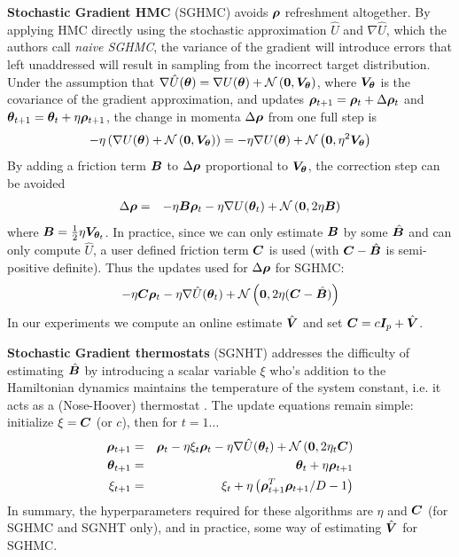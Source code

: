 \documentclass[]{article}
\begin{document}
{\bf Stochastic Gradient HMC} (SGHMC) \cite{chen2014stochastic} avoids ${\bm \rho}$ refreshment altogether.  By applying HMC directly using the stochastic approximation $\hat{U}$ and $\nabla \hat{U}$, which the authors call {\em naive SGHMC}, the variance of the gradient will introduce errors that left unaddressed will result in sampling from the incorrect target distribution.  Under the assumption that $\nabla \hat{U}({\bm \theta}) = \nabla U({\bm \theta}) + \mathcal{N}\left( {\bm 0}, {\bm V}_{{\bm \theta}}\right)$, where ${\bm V}_{{\bm \theta}}$ is the covariance of the gradient approximation, and  updates ${\bm \rho}_{t+1} = {\bm \rho}_{t} + \Delta {\bm \rho}_{t}$ and ${\bm \theta}_{t+1} = {\bm \theta}_t + \eta {\bm \rho}_{t+1}$, the change in momenta $\Delta {\bm \rho}$ from one full step is
 \begin{equation}
   - \eta \left( \nabla U({\bm \theta}) + \mathcal{N}\left( {\bm 0}, {\bm V}_{{\bm \theta}}\right)\right)  =  - \eta \nabla U({\bm \theta}) + \mathcal{N}\left( {\bm 0}, \eta^2 {\bm V}_{{\bm \theta}}\right)  
 \end{equation}
By adding a friction term ${\bm B}$ to $\Delta {\bm \rho}$ proportional to ${\bm V}_{{\bm \theta}}$, the correction step can be avoided
 \begin{eqnarray}
   \Delta {\bm \rho} & = & - \eta {\bm B} {\bm \rho}_t - \eta \nabla U({\bm \theta}_t) + \mathcal{N}\left( {\bm 0}, 2 \eta {\bm B}\right) 
 \end{eqnarray}
 where  ${\bm B}=\frac{1}{2}\eta {\bm V}_{{\bm \theta}_t}$.   In practice, since we can only estimate ${\bm B}$ by some $\hat{{\bm B}}$ and can only compute $\hat{U}$, a user defined friction term ${\bm C}$ is used (with ${\bm C} - \hat{{\bm B}}$ is semi-positive definite).  Thus the updates used for $\Delta {\bm \rho}$ for SGHMC:
 \begin{equation}
   - \eta {\bm C} {\bm \rho}_t - \eta \nabla \hat{U}({\bm \theta}_t) + \mathcal{N}\left( {\bm 0}, 2 \eta ({\bm C}-\hat{{\bm B}}) \right) 
 \end{equation}
 In our experiments we compute an online estimate $\hat{{\bm V}}$ and set ${\bm C} = c {\bm I}_p + \hat{{\bm V}}$.  
 
 {\bf Stochastic Gradient thermostats} (SGNHT) \cite{ding2014bayesian} addresses the difficulty of estimating $\hat{{\bm B}}$ by introducing a scalar variable $\xi$ who's addition to the Hamiltonian dynamics maintains the temperature of the system constant, i.e. it acts as a (Nose-Hoover) thermostat \cite{leimkuhler2009metropolis}.  The update equations remain simple: initialize $\xi = {\bm C}$ (or $c$), then for $t=1\ldots$
 \begin{eqnarray}
   {\bm \rho}_{t+1} & = & {\bm \rho}_t - \eta \xi_t {\bm \rho}_t - \eta \nabla \hat{U}({\bm \theta}_t) + \mathcal{N}\left( {\bm 0}, 2 \eta_t {\bm C} \right) \\
   {\bm \theta}_{t+1} & = & {\bm \theta}_t + \eta {\bm \rho}_{t+1} \\
   \xi_{t+1} & = & \xi_t + \eta \left(  {\bm \rho}_{t+1}^T {\bm \rho}_{t+1} / D - 1 \right)
 \end{eqnarray}
 In summary, the hyperparameters required for these algorithms are $\eta$ and ${\bm C}$ (for SGHMC and SGNHT only), and in practice, some way of estimating $\hat{{\bm V}}$ for SGHMC.  
  
\end{document}
